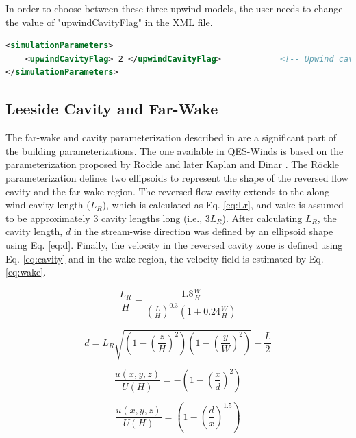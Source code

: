 In order to choose between these three upwind models, the user needs to change the value of "upwindCavityFlag" in the XML file.


\begin{lstlisting}[language=XML]
<simulationParameters>
  	<upwindCavityFlag> 2 </upwindCavityFlag> 			<!-- Upwind cavity flag (0-none, 1-Rockle, 2-MVP (default), 3-HMVP) -->
</simulationParameters>
\end{lstlisting}

\subsection{Leeside Cavity and Far-Wake}

The far-wake and cavity parameterization described in \cite{singh2005testing, singh2006testing} are a significant part of the building parameterizations. The one available in QES-Winds is based on the parameterization proposed by R\"{o}ckle \cite{rockle1990bestimmung} and later Kaplan and Dinar \cite{kaplan1996lagrangian}. The R\"{o}ckle parameterization defines two ellipsoids to represent the shape of the reversed flow cavity and the far-wake region. The reversed flow cavity extends to the along-wind cavity length
($L_R$), which is calculated as Eq. \ref{eq:Lr}, and wake is assumed to be approximately $3$ cavity lengths long (i.e., $3L_R$). After calculating $L_R$, the cavity length, $d$ in the stream-wise direction was defined by an ellipsoid shape using Eq. \ref{eq:d}. Finally, the velocity in the reversed cavity zone is defined using Eq. \ref{eq:cavity} and in the wake region, the velocity field is estimated by Eq. \ref{eq:wake}.

\begin{equation}
\frac{L_{R}}{H}=\frac{1.8 \frac{W}{H}}{\left(\frac{L}{H}\right)^{0.3}\left(1+0.24 \frac{W}{H}\right)}
\label{eq:Lr}
\end{equation}

\begin{equation}
d=L_{R} \sqrt{\left(1-\left(\frac{z}{H}\right)^{2}\right)\left(1-\left(\frac{y}{W}\right)^{2}\right)}-\frac{L}{2}
\label{eq:d}
\end{equation}

\begin{equation}
\frac{u(x, y, z)}{U(H)}=-\left(1-\left(\frac{x}{d}\right)^{2}\right)
\label{eq:cavity}
\end{equation}

\begin{equation}
\frac{u(x, y, z)}{U(H)}=\left(1-\left(\frac{d}{x}\right)^{1.5}\right)
\label{eq:wake}
\end{equation}

